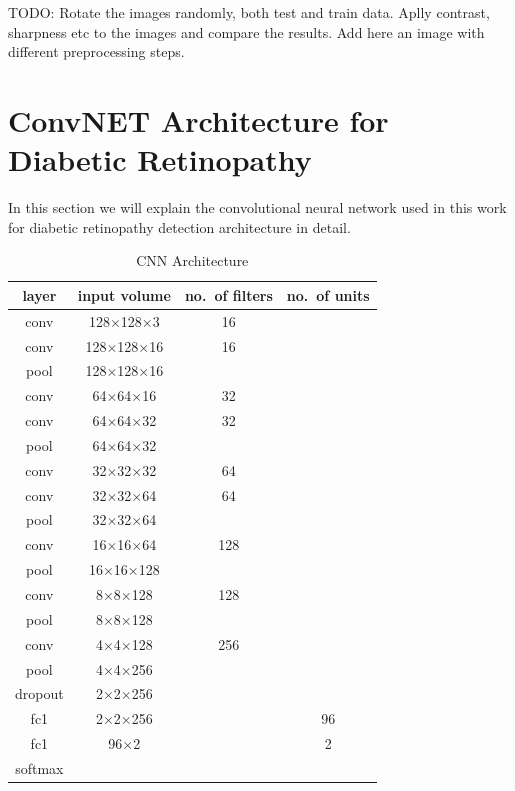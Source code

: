 TODO: Rotate the images randomly, both test and train data. 
Aplly contrast, sharpness etc to the images and compare the results. 
Add here an image with different preprocessing steps. 

\section{ConvNET Architecture for Diabetic Retinopathy}
In this section we will explain the convolutional neural network used in this work for diabetic retinopathy detection architecture in detail. 

\begin{table}[t]
\centering
\caption{CNN Architecture} \label{tab:cnnarc}
\begin{tabular}{|c|c|c|c|} \hline
\textbf{layer} & \textbf{input volume} & \textbf{no.\ of filters} & \textbf{no.\ of units} \\ \hline
conv & 128$\times$128$\times$3 & 16 & \\ \hline
conv & 128$\times$128$\times$16 & 16 & \\ \hline
pool & 128$\times$128$\times$16 &  & \\ \hline
conv & 64$\times$64$\times$16 & 32 & \\ \hline
conv & 64$\times$64$\times$32 & 32 & \\ \hline
pool & 64$\times$64$\times$32 &  & \\ \hline
conv & 32$\times$32$\times$32 & 64  & \\ \hline
conv & 32$\times$32$\times$64 & 64  & \\ \hline
pool & 32$\times$32$\times$64 &   & \\ \hline
conv & 16$\times$16$\times$64 & 128  & \\ \hline
pool & 16$\times$16$\times$128 &   & \\ \hline
conv & 8$\times$8$\times$128 & 128  & \\ \hline
pool & 8$\times$8$\times$128 &   & \\ \hline
conv & 4$\times$4$\times$128 & 256  & \\ \hline
pool & 4$\times$4$\times$256 &   & \\ \hline
dropout & 2$\times$2$\times$256 & & \\ \hline
fc1 & 2$\times$2$\times$256 & &96 \\ \hline
fc1 & 96$\times$2 & &2 \\ \hline
softmax & & & \\ \hline
\end{tabular}
\end{table}

